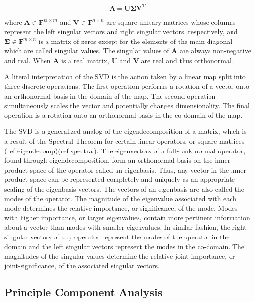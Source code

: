 \documentclass[conference]{IEEEtran}
\begin{document}
     \begin{equation*}{\mathbf{A}} = {\mathbf{U\Sigma }}{{\mathbf{V}}^{\mathbf{T}}}\tag{2}\end{equation*}

    where $\mathbf{A} \in \mathbf{F}^{m \times m}$ and $\mathbf{V} \in \mathbf{F}^{n \times n}$ are square unitary
    matrices whose columns represent the left singular vectors and right singular vectors, respectively, and $\mathbf{\Sigma} \in \mathbf{F}^{m \times n}$ is a matrix of zeros except for the elements of the main diagonal which are called singular values. The singular values of $\mathbf{A}$ are always non-negative and real. When $\mathbf{A}$ is a real matrix, $\mathbf{U}$ and $\mathbf{V}$ are real and thus orthonormal.

    A literal interpretation of the SVD is the action taken by a linear map split into three discrete operations. The first operation performs a rotation of a vector onto an orthonormal basis in the domain of the map. The second operation simultaneously scales the vector and potentially changes dimensionality. The final operation is a rotation onto an orthonormal basis in the co-domain of the map.

    The SVD is a generalized analog of the eigendecomposition of a matrix, which is a result of the Spectral Theorem for certain linear operators, or square matrices (ref eigendecomp)(ref spectral). The eigenvectors of a full-rank normal operator, found through eigendecomposition, form an orthonormal basis on the inner product space of the operator called an eigenbasis. Thus, any vector in the inner product space can be represented completely and uniquely as an appropriate scaling of the eigenbasis vectors. The vectors of an eigenbasis are also called the modes of the operator. The magnitude of the eigenvalue associated with each mode determines the relative importance, or significance, of the mode. Modes with higher importance, or larger eigenvalues, contain more pertinent information about a vector than modes with smaller eigenvalues. In similar fashion, the right singular vectors of any operator represent the modes of the operator in the domain and the left singular vectors represent the modes in the co-domain. The magnitudes of the singular values determine the relative joint-importance, or joint-significance, of the associated singular vectors.
    
    \subsection{Principle Component Analysis} \label{pca_section}
    
\end{document}
